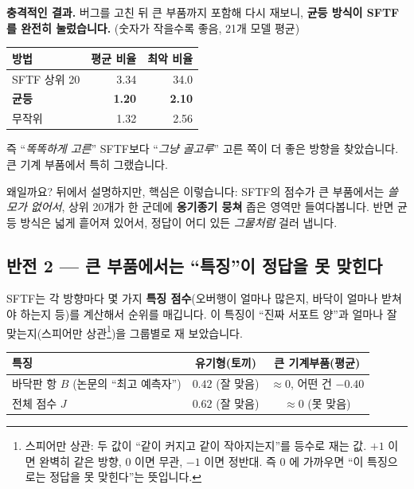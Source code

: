 \documentclass[11pt,a4paper]{article}
\begin{document}
\begin{warnbox}
\textbf{충격적인 결과.} 버그를 고친 뒤 큰 부품까지 포함해 다시 재보니, \textbf{균등
방식이 SFTF를 완전히 눌렀습니다.} (숫자가 작을수록 좋음, 21개 모델 평균)
\begin{center}
\begin{tabular}{lrr}
\toprule
방법 & 평균 비율 & 최악 비율\\
\midrule
SFTF 상위 20 & 3.34 & 34.0\\
\textbf{균등} & \textbf{1.20} & \textbf{2.10}\\
무작위 & 1.32 & 2.56\\
\bottomrule
\end{tabular}
\end{center}
즉 ``\emph{똑똑하게 고른}'' SFTF보다 ``\emph{그냥 골고루}'' 고른 쪽이 더 좋은
방향을 찾았습니다. 큰 기계 부품에서 특히 그랬습니다.
\end{warnbox}

왜일까요? 뒤에서 설명하지만, 핵심은 이렇습니다: SFTF의 점수가 큰 부품에서는
\emph{쓸모가 없어서}, 상위 20개가 한 군데에 \textbf{옹기종기 뭉쳐} 좁은 영역만
들여다봅니다. 반면 균등 방식은 넓게 흩어져 있어서, 정답이 어디 있든 \emph{그물처럼}
걸러 냅니다.

\subsection{반전 2 — 큰 부품에서는 ``특징''이 정답을 못 맞힌다}

SFTF는 각 방향마다 몇 가지 \textbf{특징 점수}(오버행이 얼마나 많은지, 바닥이 얼마나
받쳐야 하는지 등)를 계산해서 순위를 매깁니다. 이 특징이 ``진짜 서포트 양''과 얼마나
잘 맞는지(스피어만 상관\footnote{스피어만 상관: 두 값이 ``같이 커지고 같이
작아지는지''를 등수로 재는 값. $+1$ 이면 완벽히 같은 방향, $0$ 이면 무관, $-1$ 이면
정반대. 즉 $0$ 에 가까우면 ``이 특징으로는 정답을 못 맞힌다''는 뜻입니다.})을
그룹별로 재 보았습니다.

\begin{center}
\small
\begin{tabular}{lcc}
\toprule
특징 & 유기형(토끼) & 큰 기계부품(평균)\\
\midrule
바닥판 항 $B$ (논문의 ``최고 예측자'') & $0.42$ (잘 맞음) & $\approx 0$, 어떤 건 $-0.40$\\
전체 점수 $J$ & $0.62$ (잘 맞음) & $\approx 0$ (못 맞음)\\
\bottomrule
\end{tabular}
\end{center}
\end{document}
